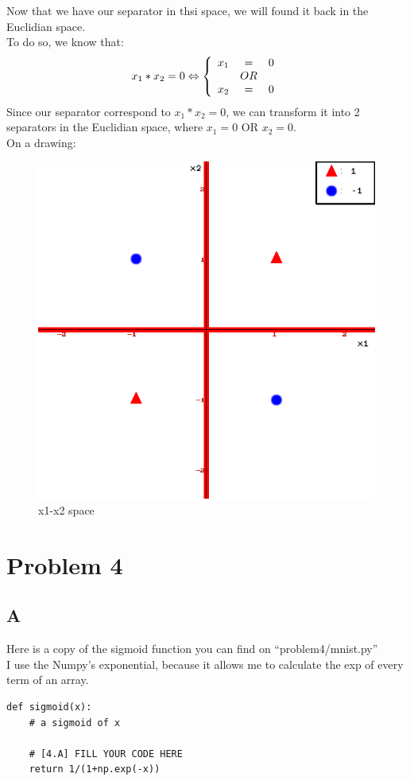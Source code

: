 \documentclass{article}
\begin{document}
            Now that we have our separator in thsi space, we will found it back in the Euclidian space.\\
            To do so, we know that:\\
            \[
                x_1*x_2=0 \Leftrightarrow\left\{
                    \begin{array}{r c l}
                        x_1 &=& 0\\
                        & OR & \\
                        x_2 &=& 0
                    \end{array}
                \right.
            \]
            Since our separator correspond to $x_1*x_2=0$, we can transform it into 2 separators in the Euclidian space, where $x_1=0$ OR $x_2=0$.\\
            On a drawing:
            \begin{figure}[H]
                \centering
                \includegraphics[scale=0.5]{problem3/x1-x2.png}
                \caption{x1-x2 space}
            \end{figure}
    \section{Problem 4}
        \subsection{A}
            Here is a copy of the sigmoid function you can find on ``problem4/mnist.py''\\
            I use the Numpy's exponential, because it allows me to calculate the exp of every term of an array.
            \begin{verbatim}
def sigmoid(x):
    # a sigmoid of x

    # [4.A] FILL YOUR CODE HERE
    return 1/(1+np.exp(-x))
            \end{verbatim}
\end{document}
